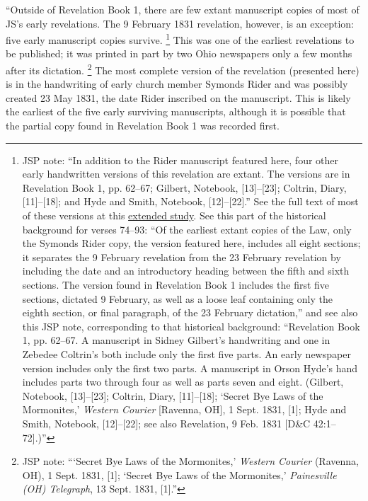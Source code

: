 				``Outside of Revelation Book 1, there are few extant manuscript copies of most of JS's early revelations. The 9 February 1831 revelation, however, is an exception: five early manuscript copies survive.%
					\footnote{%
						JSP note: ``In addition to the Rider manuscript featured here, four other early handwritten versions of this revelation are extant. The versions are in Revelation Book 1, pp. 62--67; Gilbert, Notebook, [13]--[23]; Coltrin, Diary, [11]--[18]; and Hyde and Smith, Notebook, [12]--[22].'' See the full text of most of these versions at this \hyperref[EXSS-DC42-EARLY]{extended study}. See this part of the historical background for verses 74--93: ``Of the earliest extant copies of the Law, only the Symonds Rider copy, the version featured here, includes all eight sections; it separates the 9 February revelation from the 23 February revelation by including the date and an introductory heading between the fifth and sixth sections. The version found in Revelation Book 1 includes the first five sections, dictated 9 February, as well as a loose leaf containing only the eighth section, or final paragraph, of the 23 February dictation,'' and see also this JSP note, corresponding to that historical background: ``Revelation Book 1, pp. 62--67. A manuscript in Sidney Gilbert's handwriting and one in Zebedee Coltrin's both include only the first five parts. An early newspaper version includes only the first two parts. A manuscript in Orson Hyde's hand includes parts two through four as well as parts seven and eight. (Gilbert, Notebook, [13]--[23]; Coltrin, Diary, [11]--[18]; `Secret Bye Laws of the Mormonites,' \textit{Western Courier} [Ravenna, OH], 1 Sept. 1831, [1]; Hyde and Smith, Notebook, [12]--[22]; see also Revelation, 9 Feb. 1831 [D\&C 42:1--72].)''
						}
				This was one of the earliest revelations to be published; it was printed in part by two Ohio newspapers only a few months after its dictation.%
					\footnote{%
						JSP note: ```Secret Bye Laws of the Mormonites,' \textit{Western Courier} (Ravenna, OH), 1 Sept. 1831, [1]; `Secret Bye Laws of the Mormonites,' \textit{Painesville (OH) Telegraph}, 13 Sept. 1831, [1].''
						}
				The most complete version of the revelation (presented here) is in the handwriting of early church member Symonds Rider and was possibly created 23 May 1831, the date Rider inscribed on the manuscript. This is likely the earliest of the five early surviving manuscripts, although it is possible that the partial copy found in Revelation Book 1 was recorded first.

